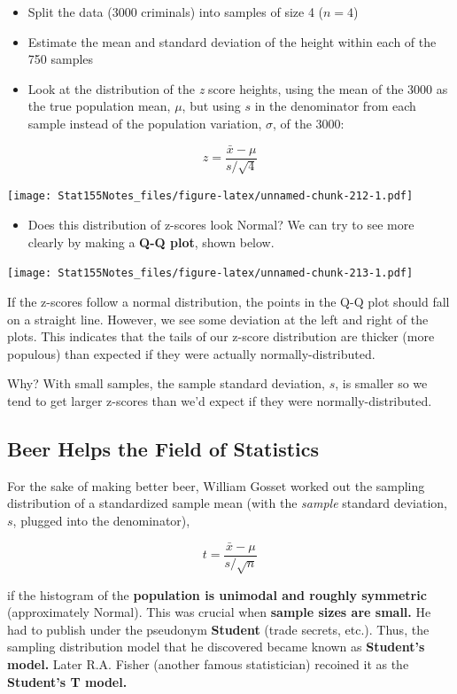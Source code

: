\documentclass[]{book}
\providecommand{\tightlist}{%
  \setlength{\itemsep}{0pt}\setlength{\parskip}{0pt}}
\begin{document}
\begin{itemize}
\tightlist
\item
  Split the data (3000 criminals) into samples of size 4 (\(n=4\))
\item
  Estimate the mean and standard deviation of the height within each of the 750 samples
\item
  Look at the distribution of the \emph{z} score heights, using the mean of the 3000 as the true population mean, \(\mu\), but using \(s\) in the denominator from each sample instead of the population variation, \(\sigma\), of the 3000:
\end{itemize}

\[ z = \frac{\bar{x} - \mu}{s/\sqrt{4}}\]

\texttt{[image: Stat155Notes\_files/figure-latex/unnamed-chunk-212-1.pdf]}

\begin{itemize}
\tightlist
\item
  Does this distribution of z-scores look Normal? We can try to see more clearly by making a \textbf{Q-Q plot}, shown below.
\end{itemize}

\texttt{[image: Stat155Notes\_files/figure-latex/unnamed-chunk-213-1.pdf]}

If the z-scores follow a normal distribution, the points in the Q-Q plot should fall on a straight line. However, we see some deviation at the left and right of the plots. This indicates that the tails of our z-score distribution are thicker (more populous) than expected if they were actually normally-distributed.

Why? With small samples, the sample standard deviation, \(s\), is smaller so we tend to get larger z-scores than we'd expect if they were normally-distributed.

\hypertarget{beer-helps-the-field-of-statistics}{%
\subsection{Beer Helps the Field of Statistics}\label{beer-helps-the-field-of-statistics}}

For the sake of making better beer, William Gosset worked out the sampling distribution of a standardized sample mean (with the \emph{sample} standard deviation, \(s\), plugged into the denominator),

\[t = \frac{\bar{x} - \mu}{s/\sqrt{n}}\]

if the histogram of the \textbf{population is unimodal and roughly symmetric} (approximately Normal). This was crucial when \textbf{sample sizes are small.} He had to publish under the pseudonym \textbf{Student} (trade secrets, etc.). Thus, the sampling distribution model that he discovered became known as \textbf{Student's model.} Later R.A. Fisher (another famous statistician) recoined it as the \textbf{Student's T model.}
\end{document}
